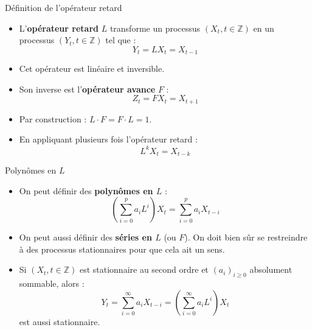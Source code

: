 \documentclass[11pt,aspectratio=169]{beamer}
\newcommand{\Z}{\mathbb{Z}}
\begin{document}
\begin{frame}{Définition de l'opérateur retard}

\begin{itemize}

\item L'\textbf{opérateur retard} $L$ transforme un processus $(X_t, t \in \Z)$ en un processus $(Y_t, t \in \Z)$ tel que :
  \[
  Y_t = LX_t = X_{t-1}
  \]\newline

\item Cet opérateur est linéaire et inversible.\newline

\item Son inverse est l'\textbf{opérateur avance} $F$ :
  \[
  Z_t = FX_t = X_{t+1}
  \]\newline

\item Par construction : $L \cdot F = F \cdot L = 1$.\newline

\item En appliquant plusieurs fois l'opérateur retard :
  \[
  L^k X_t = X_{t-k}
  \]

\end{itemize}

\end{frame}

\begin{frame}{Polynômes en $L$}

\begin{itemize}

\item On peut définir des \textbf{polynômes en $L$} :
  \[
  \left(\sum_{i=0}^{p} a_i L^i\right) X_t = \sum_{i=0}^{p} a_i X_{t-i}
  \]\newline

\item On peut aussi définir des \textbf{séries en $L$} (ou $F$). On doit bien sûr se restreindre à des processus stationnaires pour que cela ait un sens.\newline

\item Si $(X_t, t \in \Z)$ est stationnaire au second ordre et $(a_i)_{i \geq 0}$ absolument sommable, alors :
  \[
  Y_t = \sum_{i=0}^{\infty} a_i X_{t-i} = \left(\sum_{i=0}^{\infty} a_i L^i\right) X_t
  \]
  est aussi stationnaire.

\end{itemize}

\end{frame}
\end{document}
